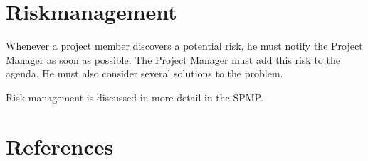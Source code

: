 \documentclass[salesmen, twoside]{softproj}
\begin{document}
\begin{projdoc}
\chapter{Riskmanagement}
Whenever a project member discovers a potential risk, he must notify the Project Manager as soon as possible. The Project Manager must add this risk to the agenda. He must also consider several solutions to the problem.

Risk management is discussed in more detail in the SPMP.

\chapter{References}
\end{projdoc}
\end{document}
